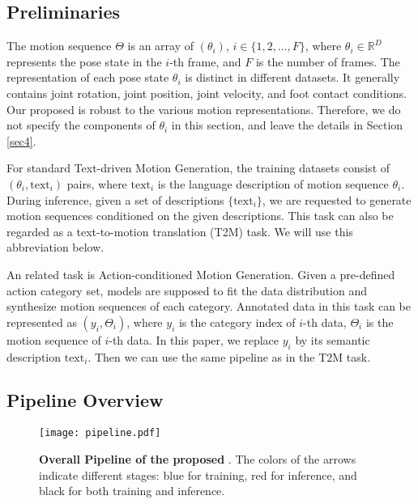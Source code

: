 \subsection{Preliminaries}\label{sec3_1}

The motion sequence $\Theta$ is an array of $(\theta_i)$, $i \in \{1,2,\dots,F\}$, where $\theta_i \in \mathbb{R}^{D}$ represents the pose state in the $i$-th frame, and $F$ is the number of frames. The representation of each pose state $\theta_i$ is distinct in different datasets. It generally contains joint rotation, joint position, joint velocity, and foot contact conditions. Our proposed \name is robust to the various motion representations. Therefore, we do not specify the components of $\theta_i$ in this section, and leave the details in Section \ref{sec4}. 

For standard Text-driven Motion Generation, the training datasets consist of $(\theta_i, \textrm{text}_i)$ pairs, where $\textrm{text}_i$ is the language description of motion sequence $\theta_i$. During inference, given a set of descriptions $\{\textrm{text}_i\}$, we are requested to generate motion sequences conditioned on the given descriptions. This task can also be regarded as a text-to-motion translation (T2M) task. We will use this abbreviation below.

An related task is Action-conditioned Motion Generation. Given a pre-defined action category set, models are supposed to fit the data distribution and synthesize motion sequences of each category. Annotated data in this task can be represented as ${(y_i, \Theta_i)}$, where $y_i$ is the category index of $i$-th data, $\Theta_i$ is the motion sequence of $i$-th data. In this paper, we replace $y_i$ by its semantic description $\textrm{text}_i$. Then we can use the same pipeline as in the T2M task.


\subsection{Pipeline Overview}\label{sec3_2}

\begin{figure*}[t]
    \centering
    \texttt{[image: pipeline.pdf]}
    \caption{\textbf{Overall Pipeline of the proposed \name}. The colors of the arrows indicate different stages: blue for training, red for inference, and black for both training and inference.}
    \label{fig:pipeline}
\end{figure*}

